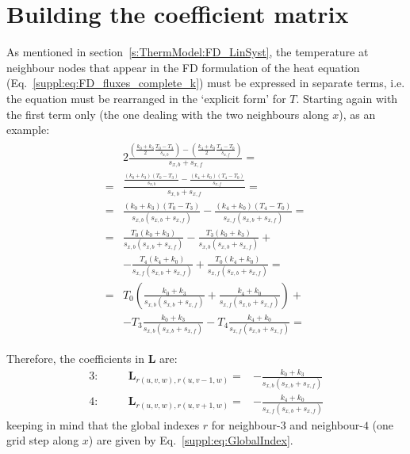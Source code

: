 \section{Building the coefficient matrix}
\label{s:ThermModel:FD_CoeffMatrix}
As mentioned in section~\ref{s:ThermModel:FD_LinSyst}, the temperature at neighbour nodes that appear in the FD formulation of the heat equation (Eq.~\ref{suppl:eq:FD_fluxes_complete_k}) must be expressed in separate terms, i.e. the equation must be rearranged in the `explicit form' for $T$.
Starting again with the first term only (the one dealing with the two neighbours along $x$), as an example:
\begin{align}
\begin{split}  
    \label{suppl:eq:FD_fluxes_complete_k_x_term}
    & 2 \frac{
        \left(
            \displaystyle \frac{k_0 + k_3}{2}
            \displaystyle \frac{T_0 - T_3}{s_{x,b}}
        \right ) -
        \left(
            \displaystyle \frac{k_4 + k_0}{2}
            \displaystyle \frac{T_4 - T_0}{s_{x,f}}
        \right )
    }{s_{x,b} + s_{x,f}} = \\[2ex]
    = &
    \frac{
        \displaystyle\frac{(k_0 + k_3) (T_0 - T_3)}{s_{x,b}} -
        \displaystyle\frac{(k_4 + k_0) (T_4 - T_0)}{s_{x,f}}
        }
    {s_{x,b} + s_{x,f}} = \\[2ex]
    = &
    \frac{(k_0 + k_3) (T_0 - T_3)}{s_{x,b} (s_{x,b} + s_{x,f})} -
    \frac{(k_4 + k_0) (T_4 - T_0)}{s_{x,f} (s_{x,b} + s_{x,f})} = \\[2ex]
    = &
    \frac{T_0 (k_0 + k_3)}{s_{x,b} (s_{x,b} + s_{x,f})} -
    \frac{T_3 (k_0 + k_3)}{s_{x,b} (s_{x,b} + s_{x,f})} + \\
    & - \frac{T_4 (k_4 + k_0)}{s_{x,f} (s_{x,b} + s_{x,f})} +
    \frac{T_0 (k_4 + k_0)}{s_{x,f} (s_{x,b} + s_{x,f})} = \\[2ex]
    = &
    T_0 \left(
        \frac{k_0 + k_3}{s_{x,b} (s_{x,b} + s_{x,f})} +
        \frac{k_4 + k_0}{s_{x,f} (s_{x,b} + s_{x,f})}
    \right) + \\
    & - T_3 \frac{k_0 + k_3}{s_{x,b} (s_{x,b} + s_{x,f})}
    - T_4 \frac{k_4 + k_0}{s_{x,f} (s_{x,b} + s_{x,f})} =
\end{split}
\end{align}

Therefore, the coefficients in $\bm{L}$ are:
\begin{align}
    \label{suppl:eq:L_coefficients_x_term}
    3: &&\quad \bm{L}_{r(u,v,w),r(u,v-1,w)} = & - \frac{k_0 + k_3}{s_{x,b} (s_{x,b} + s_{x,f})} \\[2ex]
    4: &&\quad \bm{L}_{r(u,v,w),r(u,v+1,w)} = & - \frac{k_4 + k_0}{s_{x,f} (s_{x,b} + s_{x,f})}
\end{align}
keeping in mind that the global indexes $r$ for neighbour-$3$ and neighbour-$4$ (one grid step along $x$) are given by Eq.~\ref{suppl:eq:GlobalIndex}.

